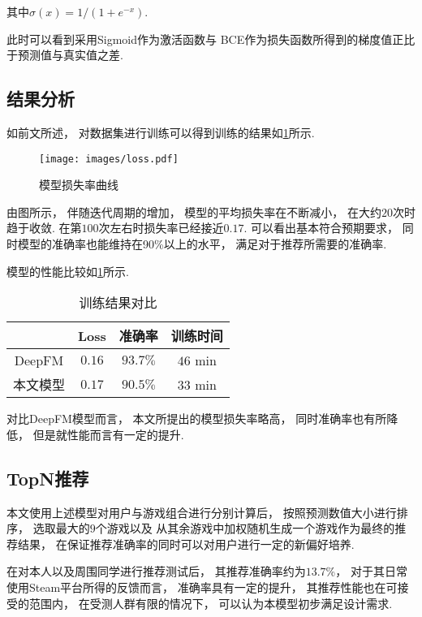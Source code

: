 其中$ \sigma(x)=1/\left(1+e^{-x}\right) $.

此时可以看到采用Sigmoid作为激活函数与
BCE作为损失函数所得到的梯度值正比于预测值与真实值之差.

\subsection{结果分析}

如前文所述，
对数据集进行训练可以得到训练的结果如\cref{fig:loss}所示.

\begin{figure}[!htbp]
  \centering
  \texttt{[image: images/loss.pdf]}
  \caption{模型损失率曲线}\label{fig:loss}
\end{figure}

由图所示，
伴随迭代周期的增加，
模型的平均损失率在不断减小，
在大约$20$次时趋于收敛.
在第$100$次左右时损失率已经接近$0.17$.
可以看出基本符合预期要求，
同时模型的准确率也能维持在90\%以上的水平，
满足对于推荐所需要的准确率.

模型的性能比较如\cref{tb:comp}所示.

\begin{table}[!htbp]
  \begin{center}
    \caption{训练结果对比}\label{tb:comp}
    \begin{tabular}{cccc}
      \toprule
             & Loss   & 准确率 & 训练时间     \\
      \midrule
      DeepFM & $0.16$ & $93.7\%$  & $46$ min \\
      本文模型   & $0.17$ & $90.5\%$  & $33$ min    \\
      \bottomrule
    \end{tabular}
  \end{center}
\end{table}

对比DeepFM模型而言，
本文所提出的模型损失率略高，
同时准确率也有所降低，
但是就性能而言有一定的提升.

\subsection{TopN推荐}

本文使用上述模型对用户与游戏组合进行分别计算后，
按照预测数值大小进行排序，
选取最大的$9$个游戏以及
从其余游戏中加权随机生成一个游戏作为最终的推荐结果，
在保证推荐准确率的同时可以对用户进行一定的新偏好培养.

在对本人以及周围同学进行推荐测试后，
其推荐准确率约为$13.7$\%，
对于其日常使用Steam平台所得的反馈而言，
准确率具有一定的提升，
其推荐性能也在可接受的范围内，
在受测人群有限的情况下，
可以认为本模型初步满足设计需求.
